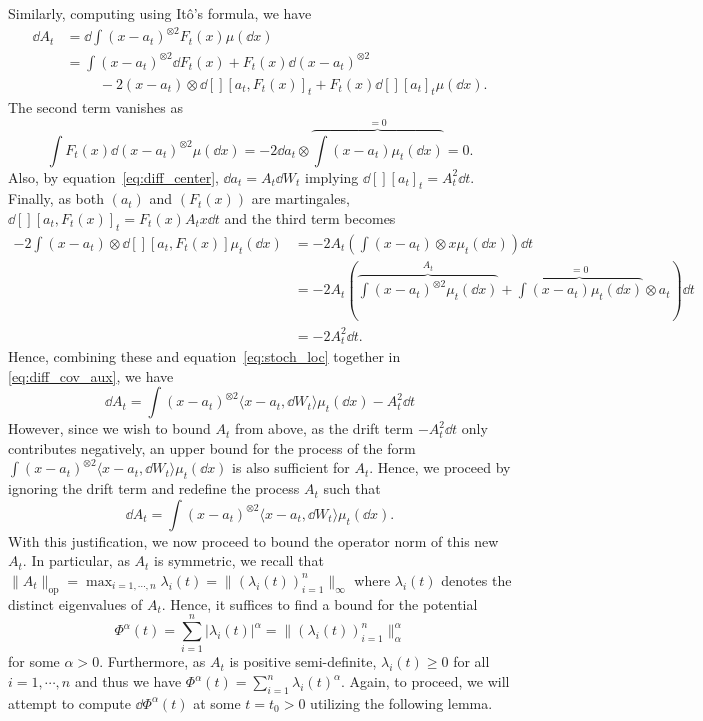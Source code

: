 Similarly, computing using Itô's formula, we have
\begin{equation}\label{eq:diff_cov_aux}
  \begin{split}
    \dd A_t & = \dd \int (x - a_t)^{\otimes 2} F_t(x) \mu(\dd x)\\
      & = \int (x - a_t)^{\otimes 2} \dd F_t(x) + F_t(x) \dd (x - a_t)^{\otimes 2}\\
      & \hspace{1cm} - 2 (x - a_t) \otimes \dd[][a_t, F_t(x)]_t +F_t(x)\dd[][a_t]_t\mu(\dd x).
  \end{split}
\end{equation}
The second term vanishes as 
\[\int F_t(x) \dd (x - a_t)^{\otimes 2} \mu(\dd x) = -2 \dd a_t \otimes 
  \overbrace{\int (x - a_t) \mu_t(\dd x)}^{= 0} = 0.\]
Also, by equation~\ref{eq:diff_center}, \(\dd a_t = A_t \dd W_t\) implying \(\dd[][a_t]_t = A_t^2 \dd t\).
Finally, as both \((a_t)\) and \((F_t(x))\) are martingales, \(\dd[] [a_t, F_t(x)]_t = F_t(x) A_t x \dd t\) 
and the third term becomes
\begin{align*}
  -2 \int (x - a_t) \otimes \dd[] [a_t, F_t(x)] \mu_t(\dd x) 
  & = - 2A_t \left(\int (x - a_t) \otimes x \mu_t(\dd x)\right) \dd t \\
  & = -2 A_t \left(\overbrace{\int (x - a_t)^{\otimes 2} \mu_t(\dd x)}^{A_t} + 
    \overbrace{\int (x - a_t) \mu_t(\dd x)}^{= 0} \otimes a_t \right) \dd t\\ 
  & = -2 A_t^2 \dd t.
\end{align*}
Hence, combining these and equation~\ref{eq:stoch_loc} together in \ref{eq:diff_cov_aux}, we have
\[\dd A_t = \int (x - a_t)^{\otimes 2} \langle x - a_t, \dd W_t \rangle \mu_t(\dd x) - A_t^2 \dd t\]
However, since we wish to bound \(A_t\) from above, as the drift term \(- A_t^2 \dd t\) only contributes 
negatively, an upper bound for the process of the form 
\(\int (x - a_t)^{\otimes 2} \langle x - a_t, \dd W_t \rangle \mu_t(\dd x)\) is also sufficient for \(A_t\).
Hence, we proceed by ignoring the drift term and redefine the process \(A_t\) such that
\begin{equation}\label{eq:diff_cov}
  \dd A_t = \int (x - a_t)^{\otimes 2} \langle x - a_t, \dd W_t \rangle \mu_t(\dd x).
\end{equation}
With this justification, we now proceed to bound the operator norm of this new \(A_t\). In particular, 
as \(A_t\) is symmetric, we recall that \(\|A_t\|_{\text{op}} = \max_{i= 1, \cdots, n} \lambda_i(t) = \|(\lambda_i(t))_{i = 1}^n\|_\infty\) 
where \(\lambda_i(t)\) denotes the distinct eigenvalues of \(A_t\). Hence, it suffices to find a bound for the potential 
\begin{equation}
  \Phi^{\alpha}(t) = \sum_{i = 1}^n |\lambda_i(t)|^{\alpha} = \|(\lambda_i(t))_{i = 1}^n\|_\alpha^\alpha
\end{equation} 
for some \(\alpha > 0\). Furthermore, as \(A_t\) is positive 
semi-definite, \(\lambda_i(t) \ge 0\) for all \(i = 1, \cdots, n\) and thus we have
\(\Phi^\alpha(t) = \sum_{i = 1}^n \lambda_i(t)^{\alpha}\). Again, to proceed, we will attempt to compute 
\(\dd \Phi^\alpha(t)\) at some \(t = t_0 > 0\) utilizing the following lemma.

